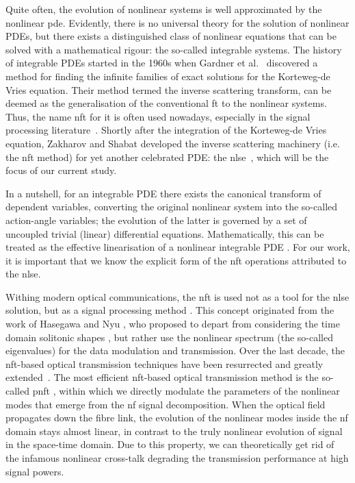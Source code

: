 Quite often, the evolution of nonlinear systems is well approximated by the nonlinear \acrfull{pde}. Evidently, there is no universal theory for the solution of nonlinear PDEs, but there exists a distinguished class of nonlinear equations that can be solved with a mathematical rigour: the so-called integrable systems. The history of integrable PDEs started in the 1960s when Gardner et al.~\cite{gardner1967} discovered a method for finding the infinite families of exact solutions for the  Korteweg-de Vries equation. Their method termed the inverse scattering transform, can be deemed as the generalisation of the conventional \acrfull{ft} to the nonlinear systems. Thus, the name \acrfull{nft} for it is often used nowadays, especially in the signal processing literature~\cite{yk14-1,turitsyn2017nonlinear}. Shortly after the integration of the Korteweg-de Vries equation, Zakharov and Shabat developed the inverse scattering machinery (i.e. the \acrshort{nft} method) for yet another celebrated PDE: the \acrfull{nlse}~\cite{zakharov1972exact}, which will be the focus of our current study.  

In a nutshell, for an integrable PDE there exists the canonical transform of dependent variables, converting the original nonlinear system into the so-called action-angle variables; the evolution of the latter is governed by a set of uncoupled trivial (linear) differential equations. Mathematically, this can be treated as the effective linearisation of a nonlinear integrable PDE \cite{akn74,nmp84}. For our work, it is important that we know the explicit form of the \acrshort{nft} operations attributed to the \acrshort{nlse}.

Withing modern optical communications, the \acrshort{nft} is used not as a tool for the \acrshort{nlse} solution, but as a signal processing method \cite{turitsyn2017nonlinear,yk14-1}. This concept originated from the work of Hasegawa and Nyu \cite{hn93}, who proposed to depart from considering the time domain solitonic shapes \cite{mg06}, but rather use the nonlinear spectrum (the so-called eigenvalues) for the data modulation and transmission. Over the last decade, the \acrshort{nft}-based optical transmission techniques have been resurrected and greatly extended~\cite{turitsyn2017nonlinear,yal19}. The most efficient \acrshort{nft}-based optical transmission method is the so-called \acrfull{pnft} \cite{yk14-1}, within which we directly modulate the parameters of the nonlinear modes that emerge from the \acrfull{nf} signal decomposition. When the optical field propagates down the fibre link, the evolution of the nonlinear modes inside the \acrshort{nf} domain stays almost linear, in contrast to the truly nonlinear evolution of signal in the space-time domain. Due to this property, we can theoretically get rid of the infamous nonlinear cross-talk degrading the transmission performance at high signal powers\cite{ekw10}. 

